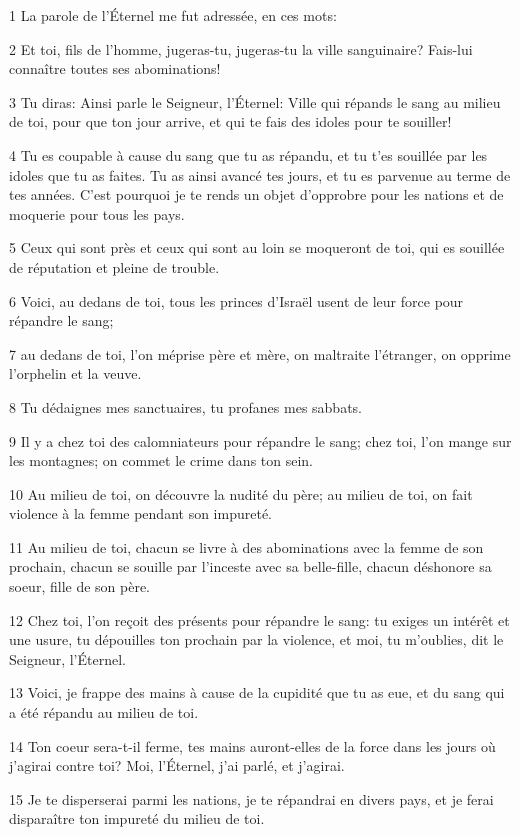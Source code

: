\par 1 La parole de l'Éternel me fut adressée, en ces mots:
\par 2 Et toi, fils de l'homme, jugeras-tu, jugeras-tu la ville sanguinaire? Fais-lui connaître toutes ses abominations!
\par 3 Tu diras: Ainsi parle le Seigneur, l'Éternel: Ville qui répands le sang au milieu de toi, pour que ton jour arrive, et qui te fais des idoles pour te souiller!
\par 4 Tu es coupable à cause du sang que tu as répandu, et tu t'es souillée par les idoles que tu as faites. Tu as ainsi avancé tes jours, et tu es parvenue au terme de tes années. C'est pourquoi je te rends un objet d'opprobre pour les nations et de moquerie pour tous les pays.
\par 5 Ceux qui sont près et ceux qui sont au loin se moqueront de toi, qui es souillée de réputation et pleine de trouble.
\par 6 Voici, au dedans de toi, tous les princes d'Israël usent de leur force pour répandre le sang;
\par 7 au dedans de toi, l'on méprise père et mère, on maltraite l'étranger, on opprime l'orphelin et la veuve.
\par 8 Tu dédaignes mes sanctuaires, tu profanes mes sabbats.
\par 9 Il y a chez toi des calomniateurs pour répandre le sang; chez toi, l'on mange sur les montagnes; on commet le crime dans ton sein.
\par 10 Au milieu de toi, on découvre la nudité du père; au milieu de toi, on fait violence à la femme pendant son impureté.
\par 11 Au milieu de toi, chacun se livre à des abominations avec la femme de son prochain, chacun se souille par l'inceste avec sa belle-fille, chacun déshonore sa soeur, fille de son père.
\par 12 Chez toi, l'on reçoit des présents pour répandre le sang: tu exiges un intérêt et une usure, tu dépouilles ton prochain par la violence, et moi, tu m'oublies, dit le Seigneur, l'Éternel.
\par 13 Voici, je frappe des mains à cause de la cupidité que tu as eue, et du sang qui a été répandu au milieu de toi.
\par 14 Ton coeur sera-t-il ferme, tes mains auront-elles de la force dans les jours où j'agirai contre toi? Moi, l'Éternel, j'ai parlé, et j'agirai.
\par 15 Je te disperserai parmi les nations, je te répandrai en divers pays, et je ferai disparaître ton impureté du milieu de toi.
